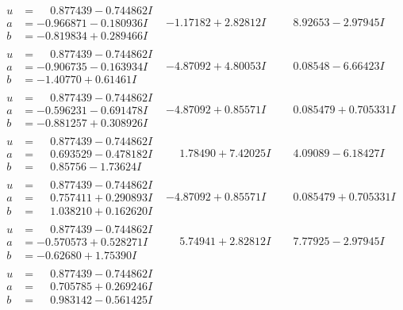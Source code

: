 \documentclass[1p]{elsarticle_modified}
\theoremstyle{definition}
\begin{document}
$$\begin{array}{c|c|c}
\begin{aligned}
u &= \phantom{-}0.877439 - 0.744862 I \\
a &= -0.966871 - 0.180936 I \\
b &= -0.819834 + 0.289466 I\end{aligned}
 & -1.17182 + 2.82812 I & \phantom{-}8.92653 - 2.97945 I \\ \hline\begin{aligned}
u &= \phantom{-}0.877439 - 0.744862 I \\
a &= -0.906735 - 0.163934 I \\
b &= -1.40770 + 0.61461 I\end{aligned}
 & -4.87092 + 4.80053 I & \phantom{-}0.08548 - 6.66423 I \\ \hline\begin{aligned}
u &= \phantom{-}0.877439 - 0.744862 I \\
a &= -0.596231 - 0.691478 I \\
b &= -0.881257 + 0.308926 I\end{aligned}
 & -4.87092 + 0.85571 I & \phantom{-}0.085479 + 0.705331 I \\ \hline\begin{aligned}
u &= \phantom{-}0.877439 - 0.744862 I \\
a &= \phantom{-}0.693529 - 0.478182 I \\
b &= \phantom{-}0.85756 - 1.73624 I\end{aligned}
 & \phantom{-}1.78490 + 7.42025 I & \phantom{-}4.09089 - 6.18427 I \\ \hline\begin{aligned}
u &= \phantom{-}0.877439 - 0.744862 I \\
a &= \phantom{-}0.757411 + 0.290893 I \\
b &= \phantom{-}1.038210 + 0.162620 I\end{aligned}
 & -4.87092 + 0.85571 I & \phantom{-}0.085479 + 0.705331 I \\ \hline\begin{aligned}
u &= \phantom{-}0.877439 - 0.744862 I \\
a &= -0.570573 + 0.528271 I \\
b &= -0.62680 + 1.75390 I\end{aligned}
 & \phantom{-}5.74941 + 2.82812 I & \phantom{-}7.77925 - 2.97945 I \\ \hline\begin{aligned}
u &= \phantom{-}0.877439 - 0.744862 I \\
a &= \phantom{-}0.705785 + 0.269246 I \\
b &= \phantom{-}0.983142 - 0.561425 I\end{aligned}

\end{array}$$
\end{document}
